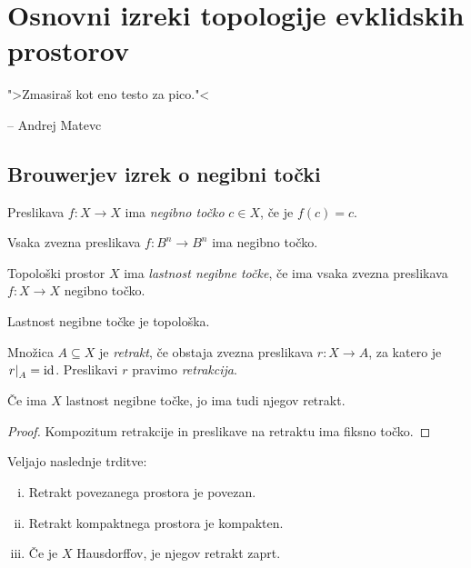 \section{Osnovni izreki topologije evklidskih prostorov}

\epigraph{">Zmasiraš kot eno testo za pico."<}
{-- Andrej Matevc}

\subsection{Brouwerjev izrek o negibni točki}

\begin{definicija}
Preslikava $f \colon X \to X$ ima
\emph{negibno točko} $c \in X$, če
je $f(c) = c$.
\end{definicija}

\begin{izrek}[Brouwer]\label{iz:br:1}
Vsaka zvezna preslikava $f \colon B^n \to B^n$ ima negibno točko.
\end{izrek}

\begin{definicija}
Topološki prostor $X$ ima
\emph{lastnost negibne točke},
če ima vsaka zvezna preslikava $f \colon X \to X$ negibno točko.
\end{definicija}

\begin{opomba}
Lastnost negibne točke je topološka.
\end{opomba}

\begin{definicija}
Množica $A \subseteq X$ je \emph{retrakt}, če obstaja
zvezna preslikava $r \colon X \to A$, za katero je
$\left. r\right|_{A}^{} = \operatorname{id}$. Preslikavi $r$ pravimo \emph{retrakcija}.
\end{definicija}

\begin{lema}
Če ima $X$ lastnost negibne točke, jo ima tudi njegov retrakt.
\end{lema}

\begin{proof}
Kompozitum retrakcije in preslikave na retraktu ima fiksno točko.
\end{proof}

\begin{trditev}
Veljajo naslednje trditve:

\begin{enumerate}[i)]
\item Retrakt povezanega prostora je povezan.
\item Retrakt kompaktnega prostora je kompakten.
\item Če je $X$ Hausdorffov, je njegov retrakt zaprt.
\end{enumerate}
\end{trditev}

